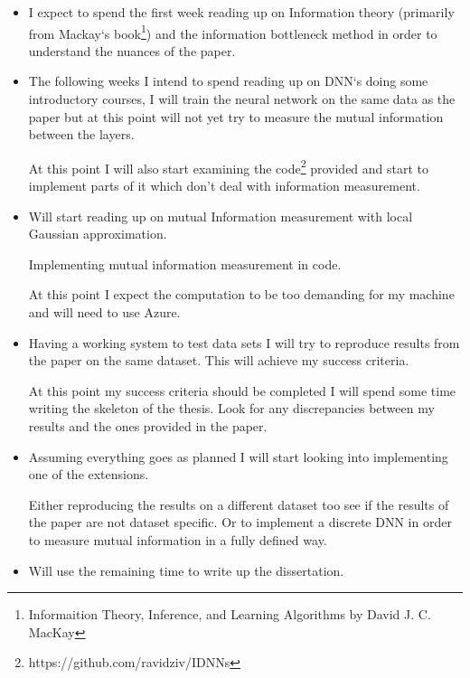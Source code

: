 \documentclass[12pt]{article}
\begin{document}



\begin{itemize}
  \item {

      I expect to spend the first week reading up on Information theory
      (primarily from Mackay`s book\footnote{Informaition Theory, Inference, and
      Learning Algorithms by David J. C. MacKay}) and the information bottleneck
      method in order to understand the nuances of the paper.
  }
  \item {
      
      The following weeks I intend to spend reading up on DNN`s doing some
      introductory courses, I will train the neural network on the same data as
      the paper but at this point will not yet try to measure the mutual
      information between the layers.

      At this point I will also start examining the
      code\footnote{https://github.com/ravidziv/IDNNs} provided and start to
      implement parts of it which don't deal with information measurement.
  }
  \item {

      Will start reading up on mutual Information measurement with local
      Gaussian approximation.

      Implementing mutual information measurement in code.

      At this point I expect the computation to be too demanding for my machine
      and will need to use Azure.
  } 
  \item {

      Having a working system to test data sets I will try to reproduce results
      from the paper on the same dataset. This will achieve my success criteria.

      At this point my success criteria should be completed I will spend some
      time writing the skeleton of the thesis. Look for any discrepancies
      between my results and the ones provided in the paper.
  } \item {

      Assuming everything goes as planned I will start looking into implementing
      one of the extensions.

      Either reproducing the results on a different dataset too see if the
      results of the paper are not dataset specific. Or to implement a discrete
      DNN in order to measure mutual information in a fully defined way.
  } \item {

      Will use the remaining time to write up the dissertation.
  }
\end{itemize}
\end{document}
